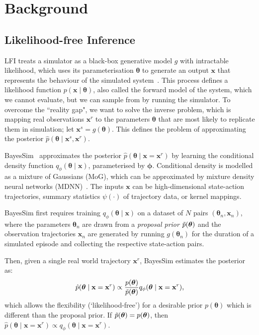 \section{Background}
\label{sec:background}

\subsection{Likelihood-free Inference}
\label{subsec:lfi-prelim}

LFI treats a simulator as a black-box generative model $g$ with intractable likelihood, which uses its parameterisation $\boldsymbol{\theta}$ to generate an output $\mathbf{x}$ that represents the behaviour of the simulated system~\cite{papamakarios2016fast}. This process defines a likelihood function $p(\mathbf{x} \mid \boldsymbol{\theta})$, also called the forward model of the system, which we cannot evaluate, but we can sample from by running the simulator.
To overcome the ``reality gap", we want to solve the inverse problem, which is mapping real observations $\mathbf{x}^r$ to the parameters $\boldsymbol{\theta}$ that are most likely to replicate them in simulation; let $\mathbf{x}^s = g(\boldsymbol{\theta})$. This defines the problem of approximating the posterior $\hat{p}(\boldsymbol{\theta} \mid \mathbf{x}^s, \mathbf{x}^r)$.

BayesSim~\cite{ramos2019bayessim} approximates the posterior $\hat{p}(\boldsymbol{\theta} \mid \mathbf{x} = \mathbf{x}^r)$ by learning the conditional density function $q_{\phi}(\boldsymbol{\theta} \mid \mathbf{x})$, parameterised by $\boldsymbol{\phi}$. Conditional density is modelled as a mixture of Gaussians (MoG), which can be approximated by mixture density neural networks (MDNN)~\cite{bishop1994mixture}. The inputs $\mathbf{x}$ can be high-dimensional state-action trajectories, summary statistics $\psi(\cdot)$ of trajectory data, or kernel mappings.

BayesSim first requires training $q_{\phi}(\boldsymbol{\theta} \mid \mathbf{x})$ on a dataset of $N$ pairs $(\boldsymbol{\theta}_n, \mathbf{x}_n)$, where the parameters $\boldsymbol{\theta}_n$ are drawn from a \emph{proposal prior} $\Tilde{p}(\boldsymbol{\theta})$ and the observation trajectories $\mathbf{x}_n$ are generated by running $g(\boldsymbol{\theta}_n)$ for the duration of a simulated episode and collecting the respective state-action pairs.

Then, given a single real world trajectory $\mathbf{x}^r$, BayesSim estimates the posterior as:
\begin{equation}
    \hat{p}(\boldsymbol{\theta} \mid \mathbf{x} = \mathbf{x}^r) \propto \frac{p(\boldsymbol{\theta})}{\Tilde{p}(\boldsymbol{\theta})} q_{\phi}(\boldsymbol{\theta} \mid \mathbf{x} = \mathbf{x}^r) \text{,}
\end{equation}
which allows the flexibility (`likelihood-free') for a desirable prior $p(\boldsymbol{\theta})$ which is different than the proposal prior. If $\Tilde{p}(\boldsymbol{\theta}) = p(\boldsymbol{\theta})$, then $ \hat{p}(\boldsymbol{\theta} \mid \mathbf{x} = \mathbf{x}^r) \propto q_{\phi}(\boldsymbol{\theta} \mid \mathbf{x} = \mathbf{x}^r)$.

